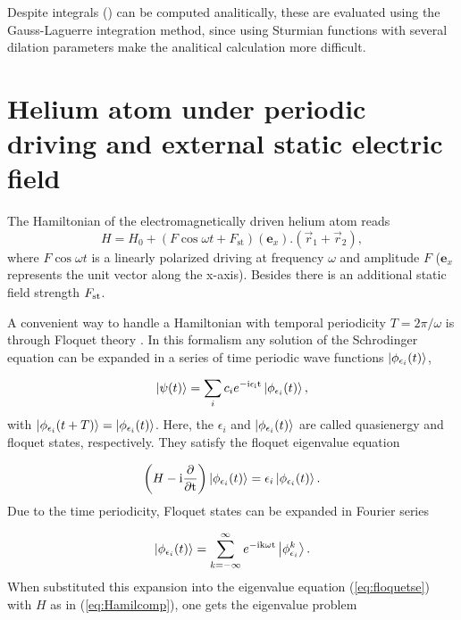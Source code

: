 Despite integrals () can be computed analitically, these are evaluated using the Gauss-Laguerre integration method, since using Sturmian functions with several dilation parameters make the analitical calculation more difficult.

\section{Helium atom under periodic driving and external static electric field}

The Hamiltonian of the electromagnetically driven helium atom  reads 
\begin{equation}
H=H_{0}+(F \cos \omega t +F_{\textrm{st}})(\textbf{e}_{x}).(\vec{r}_{1}+\vec{r}_{2}), \label{eq:Hamilcomp}
\end{equation}
where $ F \cos\omega t $ is a linearly polarized driving at frequency $ \omega $ and amplitude $ F $ ($ \textbf{e}_{x} $ represents the unit vector along the x-axis). Besides there is an additional static field strength $ F_{\rm st} $.


A convenient way to handle a Hamiltonian with temporal periodicity $ T=2\pi /\omega $ is through Floquet theory \cite{ASENS_1883_2_12__47_0,PhysRev.138.B979}. In this formalism any solution of the Schrodinger equation can be expanded in a series of time periodic wave functions $ \ket{\phi_{\epsilon_{i}}(t)} $,

\begin{equation}
\ket{\psi (t)}=\sum_{i} c_{i} e^{-\rm i \epsilon_{i}t}\ket{\phi_{\epsilon_{i}}(t)},
\end{equation}
with $ \ket{\phi_{\epsilon_{i}}(t+T)}=\ket{\phi_{\epsilon_{i}}(t)} $. Here, the $ \epsilon_{i} $ and $ \ket{\phi_{\epsilon_{i}}(t)} $ are called quasienergy and floquet states, respectively. They satisfy the floquet eigenvalue equation 

\begin{equation}
\left(H-\rm i \dfrac{\partial}{\partial t}\right)\ket{\phi_{\epsilon_{i}}(t)}=\epsilon_{i}\ket{\phi_{\epsilon_{i}}(t)}. \label{eq:floquetse}
\end{equation} 				
Due to the time periodicity, Floquet states can be expanded in Fourier series

\begin{equation}
\ket{\phi_{\epsilon_{i}}(t)}=\sum_{k=-\infty}^{\infty} e^{-\rm i  k\omega t}\ket{\phi_{\epsilon_{i}}^{k}}. \label{expansion}
\end{equation}
When substituted this expansion into the eigenvalue equation (\ref{eq:floquetse}) with $ H $ as in (\ref{eq:Hamilcomp}), one gets the eigenvalue problem 


